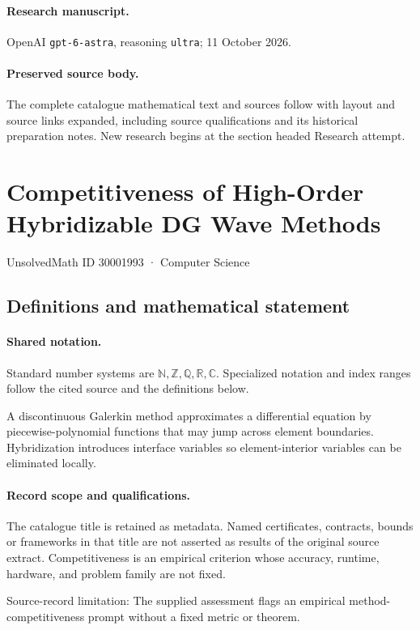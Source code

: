 \documentclass[11pt]{article}
\begin{document}
\paragraph{Research manuscript.} OpenAI \texttt{gpt-6-astra}, reasoning \texttt{ultra}; 11 October 2026.
\paragraph{Preserved source body.} The complete catalogue mathematical text and sources follow with layout and source links expanded, including source qualifications and its historical preparation notes. New research begins at the section headed Research attempt.

\section{Competitiveness of High-Order Hybridizable DG Wave Methods}\label{30001993}
{\small UnsolvedMath ID 30001993 · Computer Science}
\subsection{Definitions and mathematical statement}

\paragraph{Shared notation.}Standard number systems are $\mathbb N,\mathbb Z,\mathbb Q,\mathbb R,\mathbb C$. Specialized notation and index ranges follow the cited source and the definitions below.


A discontinuous Galerkin method approximates a differential equation by piecewise-polynomial functions that may jump across element boundaries. Hybridization introduces interface variables so element-interior variables can be eliminated locally.
\paragraph{Record scope and qualifications.}
The catalogue title is retained as metadata. Named certificates, contracts, bounds or frameworks in that title are not asserted as results of the original source extract.
Competitiveness is an empirical criterion whose accuracy, runtime, hardware, and problem family are not fixed.

Source-record limitation: The supplied assessment flags an empirical method-competitiveness prompt without a fixed metric or theorem.
\end{document}
